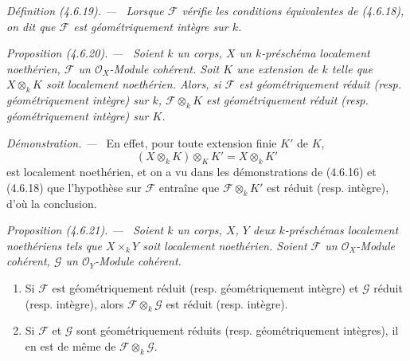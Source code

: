 \documentclass[10pt,oneside]{book}
\newenvironment{definition}[1][]{%
  \par\medskip\noindent\itshape Définition (#1). ---\ }{\par}
\newenvironment{proposition}[1][]{%
  \par\medskip\noindent\itshape Proposition (#1). ---\ }{\par}
\newenvironment{proof}{%
  \par\medskip\noindent\textit{Démonstration. ---\ }}{\par}
\begin{document}
\begin{definition}[4.6.19]
\label{IV.2.4.6.19-fr}
Lorsque $\mathscr F$ vérifie les conditions équivalentes de (4.6.18), on dit
que $\mathscr F$ est \emph{géométriquement intègre} sur $k$.
\end{definition}

\begin{proposition}[4.6.20]
\label{IV.2.4.6.20-fr}
Soient $k$ un corps, $X$ un $k$-préschéma localement noethérien, $\mathscr F$
un $\mathcal O_X$-Module cohérent. Soit $K$ une extension de $k$ telle que
$X\otimes_k K$ soit localement noethérien. Alors, si $\mathscr F$ est
géométriquement réduit (resp. géométriquement intègre) sur $k$,
$\mathscr F\otimes_k K$ est géométriquement réduit (resp. géométriquement
intègre) sur $K$.
\end{proposition}

\begin{proof}
En effet, pour toute extension finie $K'$ de $K$,
\[
(X\otimes_k K)\otimes_K K'=X\otimes_k K'
\]
est localement noethérien, et on a vu dans les démonstrations de (4.6.16) et
(4.6.18) que l'hypothèse sur $\mathscr F$ entraîne que
$\mathscr F\otimes_k K'$ est réduit (resp. intègre), d'où la conclusion.
\end{proof}

\begin{proposition}[4.6.21]
\label{IV.2.4.6.21-fr}
Soient $k$ un corps, $X$, $Y$ deux $k$-préschémas localement noethériens tels
que $X\times_k Y$ soit localement noethérien. Soient $\mathscr F$ un
$\mathcal O_X$-Module cohérent, $\mathscr G$ un $\mathcal O_Y$-Module cohérent.
\begin{enumerate}
\item[(i)] Si $\mathscr F$ est géométriquement réduit (resp. géométriquement
intègre) et $\mathscr G$ réduit (resp. intègre), alors
$\mathscr F\otimes_k\mathscr G$ est réduit (resp. intègre).
\item[(ii)] Si $\mathscr F$ et $\mathscr G$ sont géométriquement réduits (resp.
géométriquement intègres), il en est de même de
$\mathscr F\otimes_k\mathscr G$.
\end{enumerate}
\end{proposition}
\end{document}
